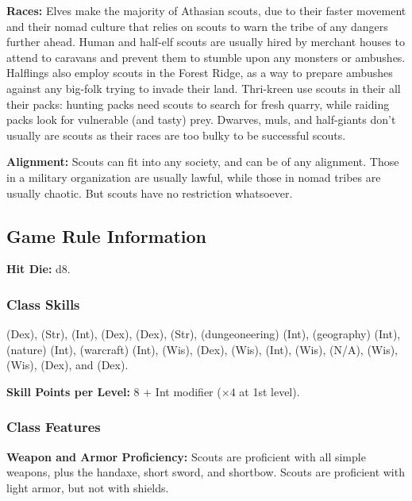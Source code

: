 \textbf{Races:} Elves make the majority of Athasian scouts, due to their faster movement and their nomad culture that relies on scouts to warn the tribe of any dangers further ahead. Human and half-elf scouts are usually hired by merchant houses to attend to caravans and prevent them to stumble upon any monsters or ambushes. Halflings also employ scouts in the Forest Ridge, as a way to prepare ambushes against any big-folk trying to invade their land. Thri-kreen use scouts in their all their packs: hunting packs need scouts to search for fresh quarry, while raiding packs look for vulnerable (and tasty) prey. Dwarves, muls, and half-giants don't usually are scouts as their races are too bulky to be successful scouts.

\textbf{Alignment:} Scouts can fit into any society, and can be of any alignment. Those in a military organization are usually lawful, while those in nomad tribes are usually chaotic. But scouts have no restriction whatsoever.

\subsection{Game Rule Information}
\textbf{Hit Die:} d8.

\subsubsection{Class Skills}
 (Dex),
 (Str),
 (Int),
 (Dex),
 (Dex),
 (Str),
 (dungeoneering) (Int),
 (geography) (Int),
 (nature) (Int),
 (warcraft) (Int),
 (Wis),
 (Dex),
 (Wis),
 (Int),
 (Wis),
 (N/A),
 (Wis),
 (Wis),
 (Dex),
and  (Dex).

\textbf{Skill Points per Level:} 8 + Int modifier ($\times4$ at 1st level).

\subsubsection{Class Features}
\textbf{Weapon and Armor Proficiency:} Scouts are proficient with all simple weapons, plus the handaxe, short sword, and shortbow. Scouts are proficient with light armor, but not with shields.


